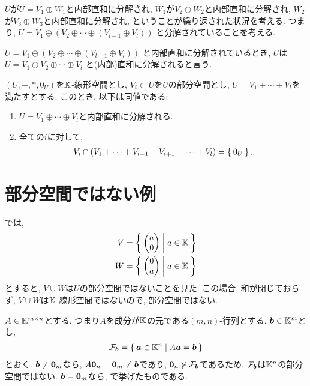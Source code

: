 $U$が$U=V_1\oplus W_1$と内部直和に分解され,
$W_1$が$V_2\oplus W_2$と内部直和に分解され,
$W_2$が$V_3\oplus W_3$と内部直和に分解され,
ということが繰り返された状況を考える.
つまり,
$U=V_1\oplus (V_2\oplus \cdots \oplus(V_{l-1}\oplus V_l))$
と分解されていることを考える.
\begin{definition}
$U=V_1\oplus (V_2\oplus \cdots \oplus(V_{l-1}\oplus V_l))$
と内部直和に分解されているとき,
$U$は$U=V_1\oplus V_2\oplus \cdots \oplus V_l$
と(内部)直和に分解されると言う.
\end{definition}
\begin{prop}
  $(U,\plus,\ast,0_U)$を$\mathbb{K}$-線形空間とし, $V_i\subset U$を$U$の部分空間とし,
  $U=V_1+\cdots+ V_l$を満たすとする.
  このとき, 以下は同値である:
  \begin{enumerate}
  \item $U=V_1\oplus \cdots \oplus V_l$と内部直和に分解される.
  \item 全ての$i$に対して,
    \begin{align*}
      V_i \cap (V_1+\cdots+ V_{i-1}+V_{i+1}+\cdots+ V_{l})=\Set{0_U}.
    \end{align*}
  \end{enumerate}
\end{prop}


\section{部分空間ではない例}
\label{sec:subspace:non}

\begin{example}
  では,
  \begin{align*}
    V&=\Set{\begin{pmatrix}a\\0\end{pmatrix}|a\in\mathbb{K}}\\
    W&=\Set{\begin{pmatrix}0\\a\end{pmatrix}|a\in\mathbb{K}}
  \end{align*}
  とすると, $V\cup W$は$U$の部分空間ではないことを見た.
  この場合, 和が閉じておらず, $V\cup W$は$\mathbb{K}$-線形空間ではないので,
  部分空間ではない.
\end{example}

\begin{example}
  \label{subsp:nonexample:fiber}
  $A\in \mathbb{K}^{m\times n}$とする.
  つまり$A$を成分が$\mathbb{K}$の元である$(m,n)$-行列とする.
  $\boldsymbol{b}\in \mathbb{K}^m$とし,
  \begin{align*}
    \mathcal{F}_{\boldsymbol{b}}=\Set{\boldsymbol{a}\in \mathbb{K}^n|A\boldsymbol{a}=\boldsymbol{b}}
  \end{align*}
  とおく.
  $\boldsymbol{b}\neq \boldsymbol{0}_m$なら,
  $A\boldsymbol{0}_n=\boldsymbol{0}_m\neq \boldsymbol{b}$であり,
  $\boldsymbol{0}_n\not\in \mathcal{F}_{\boldsymbol{b}}$であるため,
  $\mathcal{F}_{\boldsymbol{b}}$は$\mathbb{K}^n$の部分空間ではない.
  $\boldsymbol{b}= \boldsymbol{0}_m$なら,
  で挙げたものである.
\end{example}


